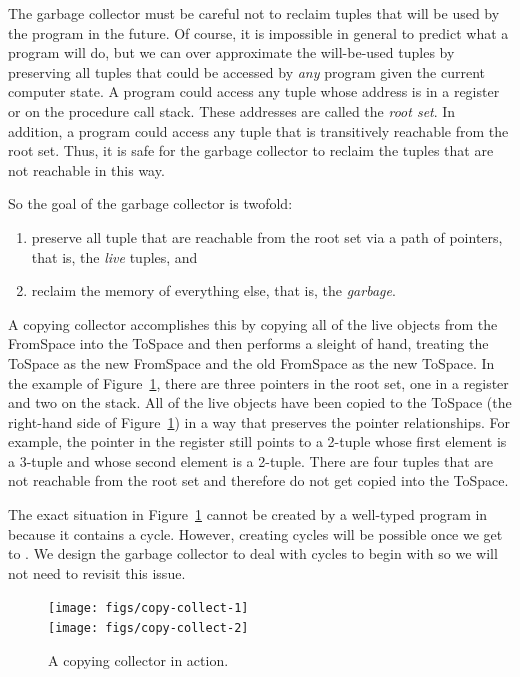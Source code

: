 \documentclass[7x10]{TimesAPriori_MIT}%
\begin{document}
The garbage collector must be careful not to reclaim tuples that will
be used by the program in the future. Of course, it is impossible in
general to predict what a program will do, but we can over approximate
the will-be-used tuples by preserving all tuples that could be
accessed by \emph{any} program given the current computer state.  A
program could access any tuple whose address is in a register or on
the procedure call stack. These addresses are called the \emph{root
  set}. In addition, a program could access any tuple that is
transitively reachable from the root set. Thus, it is safe for the
garbage collector to reclaim the tuples that are not reachable in this
way.

So the goal of the garbage collector is twofold:
\begin{enumerate}
\item preserve all tuple that are reachable from the root set via a
  path of pointers, that is, the \emph{live} tuples, and
\item reclaim the memory of everything else, that is, the
  \emph{garbage}.
\end{enumerate}
A copying collector accomplishes this by copying all of the live
objects from the FromSpace into the ToSpace and then performs a sleight
of hand, treating the ToSpace as the new FromSpace and the old
FromSpace as the new ToSpace.  In the example of
Figure~\ref{fig:copying-collector}, there are three pointers in the
root set, one in a register and two on the stack.  All of the live
objects have been copied to the ToSpace (the right-hand side of
Figure~\ref{fig:copying-collector}) in a way that preserves the
pointer relationships. For example, the pointer in the register still
points to a 2-tuple whose first element is a 3-tuple and whose second
element is a 2-tuple.  There are four tuples that are not reachable
from the root set and therefore do not get copied into the ToSpace.

The exact situation in Figure~\ref{fig:copying-collector} cannot be
created by a well-typed program in \LangVec{} because it contains a
cycle. However, creating cycles will be possible once we get to \LangAny{}.
We design the garbage collector to deal with cycles to begin with so
we will not need to revisit this issue.

\begin{figure}[tbp]
\centering
\texttt{[image: figs/copy-collect-1]} \\[5ex]
\texttt{[image: figs/copy-collect-2]}
\caption{A copying collector in action.}
\label{fig:copying-collector}
\end{figure}
\end{document}
